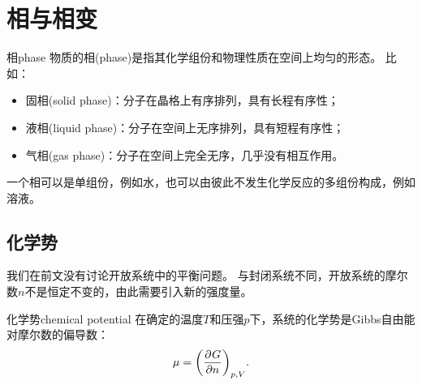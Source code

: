 \newcommand*{\phI}{\mathrm{I}}
\newcommand*{\phII}{\mathrm{II}}
\newcommand*{\phs}{\mathrm{s}}
\newcommand*{\phl}{\mathrm{l}}
\newcommand*{\phg}{\mathrm{g}}
\newcommand*{\phaq}{\mathrm{aq}}
\newcommand*{\phel}{\mathrm{el}}

\newcommand*{\crt}{\mathrm C}
\newcommand*{\tri}{_\mathrm{tr}}

\chapter{相与相变}
\label{chap:phase}

\begin{definition}
	{相}{phase}
	物质的相(phase)是指其化学组份和物理性质在空间上均匀的形态。
	比如：
	\begin{itemize}
		\item 固相(solid phase)：分子在晶格上有序排列，具有长程有序性；
		\item 液相(liquid phase)：分子在空间上无序排列，具有短程有序性；
		\item 气相(gas phase)：分子在空间上完全无序，几乎没有相互作用。
	\end{itemize}
\end{definition}

\begin{remark}
	一个相可以是单组份，例如水，也可以由彼此不发生化学反应的多组份构成，例如溶液。
\end{remark}


\section{化学势}
\label{sec:chemical potential}

我们在前文没有讨论开放系统中的平衡问题。
与封闭系统不同，开放系统的摩尔数$n$不是恒定不变的，由此需要引入新的强度量。

\begin{definition}
	{化学势}{chemical potential}
	在确定的温度$T$和压强$p$下，系统的化学势是Gibbs自由能对摩尔数的偏导数：
	\begin{equation}
		\mu=\pu[p,V]Gn.
	\end{equation}
\end{definition}

